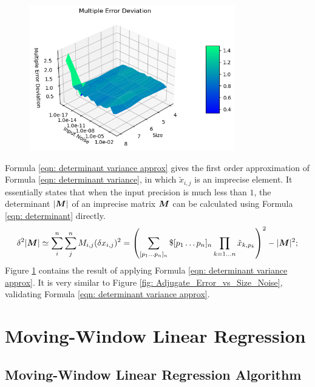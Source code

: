 \documentclass[twoside]{article}
\numberwithin{equation}{section}
\begin{document}
\begin{figure}[p]
\centering
\includegraphics[height=2.5in]{Multiply_Error_vs_Size_Noise.png} 
\label{fig: Multiply_Error_vs_Size_Noise}
\end{figure}

Formula \eqref{eqn: determinant variance approx} gives the first order approximation of Formula \eqref{eqn: determinant variance}, in which $\tilde{x}_{i,j}$ is an imprecise element.
It essentially states that when the input precision is much less than $1$, the determinant $|\protect{\textrm{\boldmath $M$}}|$ of an imprecise matrix $\protect{\textrm{\boldmath $M$}}$ can be calculated using Formula \eqref{eqn: determinant} directly.
\begin{equation}
\label{eqn: determinant variance approx}
\delta^2 |\protect{\textrm{\boldmath $M$}}| \simeq \sum_{i}^{n} \sum_{j}^{n} M_{i,j} (\delta x_{i,j})^2
 = \left( \sum_{[p_1\dots p_n]_n} \$ [p_1\dots p_n]_n \prod_{k=1 \dots n} \tilde{x}_{k,p_{k}} \right)^2 - |\protect{\textrm{\boldmath $M$}}|^2;
\end{equation}
Figure \ref{fig: Multiply_Error_vs_Size_Noise} contains the result of applying Formula \eqref{eqn: determinant variance approx}.
It is very similar to Figure \ref{fig: Adjugate_Error_vs_Size_Noise}, validating Formula \eqref{eqn: determinant variance approx}.






\clearpage
\section{Moving-Window Linear Regression}
\label{sec: Moving-Window Linear Regression}

\subsection{Moving-Window Linear Regression Algorithm}
\end{document}
